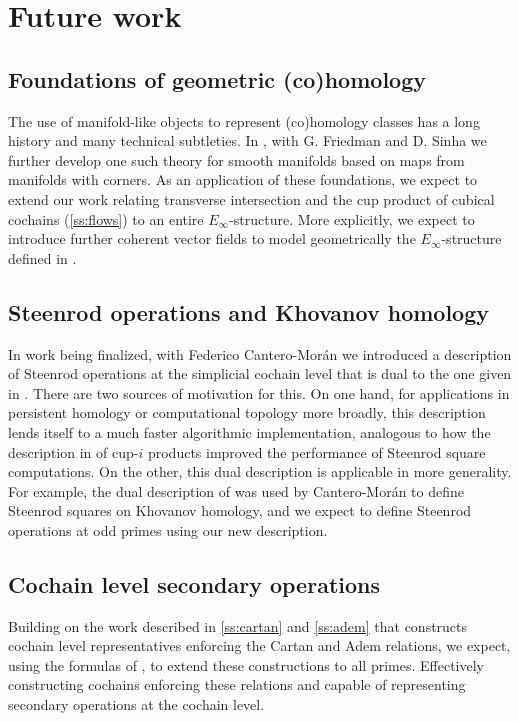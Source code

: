 
\section{Future work}

\subsection{Foundations of geometric (co)homology}

The use of manifold-like objects to represent (co)homology classes has a long history and many technical subtleties.
In \cite{medina2021foundations}, with G. Friedman and D. Sinha we further develop one such theory for smooth manifolds based on maps from manifolds with corners.
As an application of these foundations, we expect to extend our work relating transverse intersection and the cup product of cubical cochains (\cref{ss:flows}) to an entire $E_\infty$-structure.
More explicitly, we expect to introduce further coherent vector fields to model geometrically the $E_\infty$-structure defined in \cite{medina2021cubical}.

\subsection{Steenrod operations and Khovanov homology}

In work being finalized, with Federico Cantero-Mor\'{a}n we introduced a description of Steenrod operations at the simplicial cochain level that is dual to the one given in \cite{medina2020maysteenrod}.
There are two sources of motivation for this.
On one hand, for applications in persistent homology or computational topology more broadly, this description lends itself to a much faster algorithmic implementation, analogous to how the description in \cite{medina2021newformulas} of cup-$i$ products improved the performance of Steenrod square computations.
On the other, this dual description is applicable in more generality.
For example, the dual description of \cite{medina2021newformulas} was used by Cantero-Mor\'{a}n to define Steenrod squares on Khovanov homology, and we expect to define Steenrod operations at odd primes using our new description.

\subsection{Cochain level secondary operations}

Building on the work described in \cref{ss:cartan} and \cref{ss:adem} that constructs cochain level representatives enforcing the Cartan and Adem relations, we expect, using the formulas of \cite{medina2020maysteenrod}, to extend these constructions to all primes.
Effectively constructing cochains enforcing these relations and capable of representing secondary operations at the cochain level.

